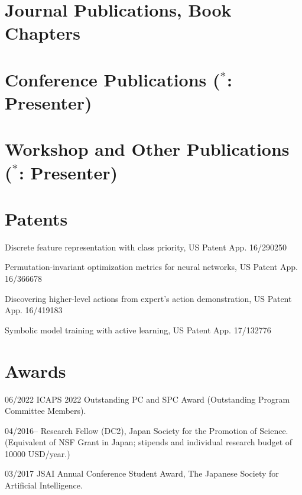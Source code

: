 \section{Journal Publications, Book Chapters}

\nocite{Asai2022}
\nocite{Asai2021}
\nocite{Asai2017}
\putbib

\section{Conference Publications ($^*$: Presenter)}

\nocite{Asai2022b}
\nocite{Asai2022c}
\nocite{Asai2020}
\nocite{Asai2019a}
\nocite{Asai2019b}
\nocite{Asai2018}
\nocite{Asai2017e}
\nocite{Asai2017b}
\nocite{Asai2016b}
\nocite{Asai2016}
\nocite{Asai2015}
\nocite{Asai2014}
\putbib

\section{Workshop and Other Publications ($^*$: Presenter)}

\nocite{asaiphd}
\nocite{Asai2022d}
\nocite{asai2021generating}
\nocite{Asai2020b}
\nocite{Asai2020c}
\nocite{Asai2019c}
\nocite{Asai2018b}
\nocite{Asai2016c}
\nocite{Endo2016}
\nocite{Asai2014b}
\putbib


\section{Patents}

\begin{CV}
 \item Discrete feature representation with class priority, US Patent App. 16/290250
 \item Permutation-invariant optimization metrics for neural networks, US Patent App. 16/366678
 \item Discovering higher-level actions from expert's action demonstration, US Patent App. 16/419183
 \item Symbolic model training with active learning, US Patent App. 17/132776
\end{CV}

\section{Awards}

\begin{CV}
 \item[06/2022] ICAPS 2022 Outstanding PC and SPC Award (Outstanding Program Committee Members).

 \item[04/2016--] Research Fellow (DC2), Japan Society for the Promotion of Science.
 (Equivalent of NSF Grant in Japan; stipends and individual research budget of 10000 USD/year.)
 \item[03/2017]
 JSAI Annual Conference Student Award, The Japanese Society for Artificial Intelligence.
\end{CV}

